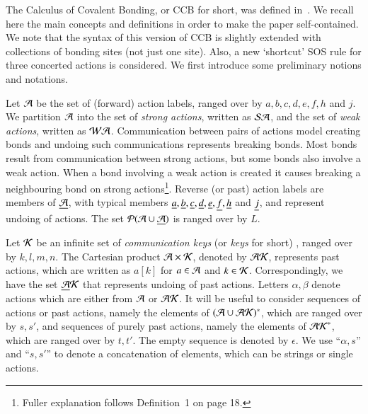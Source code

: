 %
The Calculus of Covalent Bonding, or CCB for short, was defined in~\cite{KU2017}. 
We recall here the main concepts and definitions in order to make the paper self-contained. 
We note that the syntax of this version of CCB is slightly extended with collections of bonding sites (not just one site).
Also, a new `shortcut'  SOS rule for three concerted actions is considered. 
We first introduce some preliminary notions and notations.

Let $\mathcal{A}$ be the set of (forward) action labels, 
ranged over by $a,b,c,d,e,f,h$ and $j$. We partition $\mathcal{A}$ into the set of \emph{strong actions}, written as
$\mathcal{SA}$, and the set of \emph{weak actions}, written as $\mathcal{WA}$. 
Communication between pairs of actions model creating bonds and undoing such communications represents breaking bonds. Most bonds result from communication between strong actions, but some bonds also involve a weak action. When a bond involving a weak action is created it causes breaking a neighbouring bond on strong actions\footnote{Fuller explanation follows Definition~1 on page 18.
}.
Reverse (or past) action labels are members of
$\underline{\mathcal{A}}$, with typical members $\underline {a},\underline {b}, \underline {c},\underline {d}, \underline {e} ,\underline {f}, \underline {h}$ and $\underline {j}$, and represent 
undoing of actions. The set $\mathcal{P}(\mathcal{A} \cup \underline{\mathcal{A}})$ is ranged over by $L$.

Let $\mathcal{K}$ be an infinite set of {\em communication keys} (or {\em keys} for short)
\cite{PhillipsUlidowski06,PHILLIPS200770}, ranged over by $k,l, m,n$. The Cartesian product $\mathcal A \times \mathcal{K}$, denoted by $\mathcal{AK}$,
 represents past actions, which are written as $a[k]$ for $a\in \mathcal{A}$ and $k\in\mathcal{K}$. 
Correspondingly, we have the set $\underline{\mathcal{A}}\mathcal{K}$ that represents undoing of past actions. Letters $\alpha, \beta$ denote actions which are either from $\mathcal{A}$ or $\mathcal{AK}$. It will be 
useful to consider sequences of actions or past actions, namely the elements of $(\mathcal{A} \cup \mathcal{AK})^*$, 
which are ranged over by $s,s'$, and sequences of purely past actions, namely the elements of $\mathcal{AK}^*$, 
which are ranged over by $t,t'$. The empty sequence is denoted by $\epsilon$. We use ``$\alpha, s$'' and
``$s,s'$'' to denote a concatenation of elements, which can be strings or single actions.

